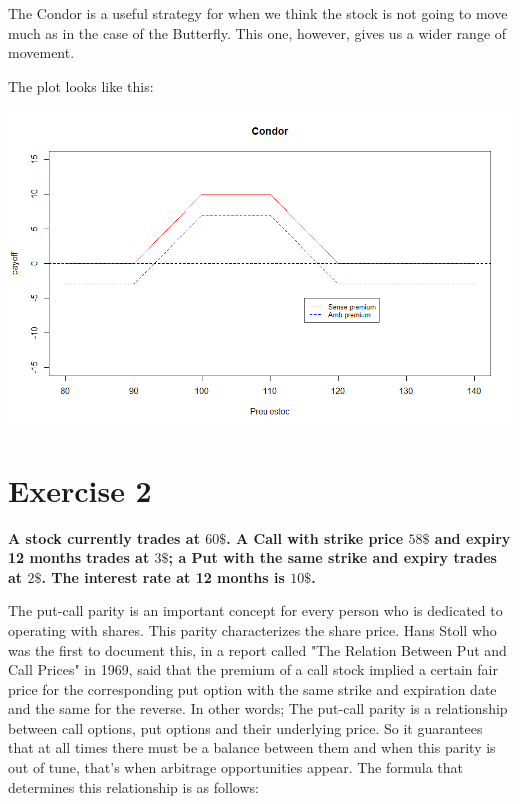 \documentclass[a4paper,]{article}
\begin{document}
\begin{itemize}
    The Condor is a useful strategy for when we think the stock is not going to move much as in the case of the Butterfly. This one, however, gives us a wider range of movement.

    \vspace{3mm}
    \noindent
    The plot looks like this:

    \includegraphics[scale=0.5]{Condor.png}
\end{itemize}

\newpage
\section*{Exercise 2}

\textbf{A stock currently trades at $60\$$. A Call with strike price $58\$$ and expiry 12 months trades at $3\$$; a Put with the same strike and expiry trades at $2\$$. The interest rate at 12 months is $10\$$.}

\vspace{3mm}
\noindent
The put-call parity is an important concept for every person who is dedicated to operating with shares. This parity characterizes the share price. Hans Stoll who was the first to document this, in a report called "The Relation Between Put and Call Prices" in 1969, said that the premium of a call stock implied a certain fair price for the corresponding put option with the same strike and expiration date and the same for the reverse. In other words; The put-call parity is a relationship between call options, put options and their underlying price. So it guarantees that at all times there must be a balance between them and when this parity is out of tune, that's when arbitrage opportunities appear. The formula that determines this relationship is as follows:
\end{document}
